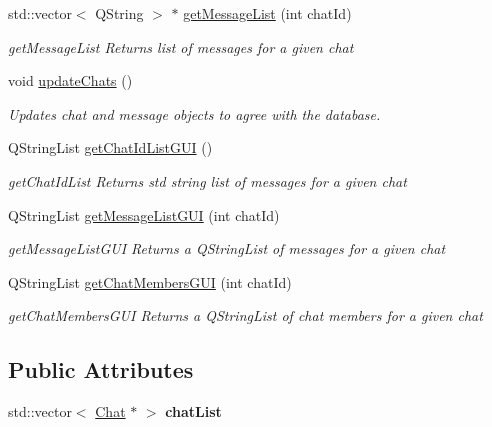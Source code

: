 \begin{DoxyCompactItemize}
std\+::vector$<$ Q\+String $>$ $\ast$ \hyperlink{classChatController_a53377ed34f11050e37ad2c36a305e880}{get\+Message\+List} (int chat\+Id)
\begin{DoxyCompactList}\small\item\em get\+Message\+List Returns list of messages for a given chat \end{DoxyCompactList}\item 
void \hyperlink{classChatController_a88da4d788443ff833db968359a7d31d5}{update\+Chats} ()\hypertarget{classChatController_a88da4d788443ff833db968359a7d31d5}{}\label{classChatController_a88da4d788443ff833db968359a7d31d5}

\begin{DoxyCompactList}\small\item\em Updates chat and message objects to agree with the database. \end{DoxyCompactList}\item 
Q\+String\+List \hyperlink{classChatController_a0937cbbf50a669da60715327794149a7}{get\+Chat\+Id\+List\+G\+UI} ()
\begin{DoxyCompactList}\small\item\em get\+Chat\+Id\+List Returns std string list of messages for a given chat \end{DoxyCompactList}\item 
Q\+String\+List \hyperlink{classChatController_afd227d0c6e8e891c4c57945c1807eaa2}{get\+Message\+List\+G\+UI} (int chat\+Id)
\begin{DoxyCompactList}\small\item\em get\+Message\+List\+G\+UI Returns a Q\+String\+List of messages for a given chat \end{DoxyCompactList}\item 
Q\+String\+List \hyperlink{classChatController_a3f97f32d49b7e9435acf60527e27eb61}{get\+Chat\+Members\+G\+UI} (int chat\+Id)
\begin{DoxyCompactList}\small\item\em get\+Chat\+Members\+G\+UI Returns a Q\+String\+List of chat members for a given chat \end{DoxyCompactList}\end{DoxyCompactItemize}
\subsection*{Public Attributes}
\begin{DoxyCompactItemize}
\item 
std\+::vector$<$ \hyperlink{classChat}{Chat} $\ast$ $>$ {\bfseries chat\+List}\hypertarget{classChatController_a5e626784fc3ce8ea86e13985d0471427}{}\label{classChatController_a5e626784fc3ce8ea86e13985d0471427}

\end{DoxyCompactItemize}


